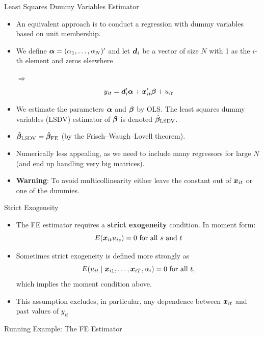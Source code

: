 \documentclass[english, professionalfonts,smaller,xcolor=dvipsnames]{beamer}
\begin{document}
\begin{frame}{Least Squares Dummy Variables Estimator}
\begin{itemize}
\item An equivalent approach is to conduct a regression with dummy variables based on unit membership.
\item We define $\bm \alpha = (\alpha_1,\ldots,\alpha_N )'$ and let $\bm d_i$ be a vector of size $N$ with 1 as the $i$-th element and zeros elsewhere 

$\Rightarrow$
$$
y_{it} = \bm d_i'\bm \alpha + \bm x_{it}' \bm \beta + u_{it}
$$
\vspace*{-\baselineskip}
\item We estimate the parameters $\bm \alpha$ and $\bm \beta$ by OLS. The least squares dummy variables (LSDV) estimator of $\bm \beta$ is denoted $\hat{\bm \beta}_{\mathrm{LSDV}}$.
\item $\hat{\bm \beta}_{\mathrm{LSDV}} = \hat{\bm \beta}_{\mathrm{FE}}$ (by the Frisch--Waugh--Lovell theorem).
\item Numerically less appealing, as we need to include many regressors for large $N$ (and end up handling very big matrices).
\item \textbf{Warning}: To avoid multicollinearity either leave the constant out of $\bm x_{it}$ or one of the dummies. 
\end{itemize}
\end{frame}

\begin{frame}{Strict Exogeneity}
\begin{itemize}
\item The FE estimator requires a \textbf{strict exogeneity} condition. In moment form:
$$
E(\bm x_{it} u_{is}) = 0 \text{ for all~$s$ and~$t$}
$$
\item Sometimes strict exogeneity is defined more strongly as
$$
E(u_{it}\mid \bm x_{i1},\ldots,\bm x_{iT},\alpha_i)=0 \text{ for all~$t$},
$$
which implies the moment condition above.
\item This assumption excludes, in particular, any dependence between $\bm x_{it}$ and past values of $y_{it}$
\end{itemize}
\end{frame}

\begin{frame}{Running Example: The FE Estimator}

\end{frame}
\end{document}
